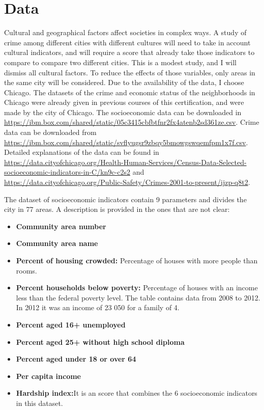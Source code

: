\documentclass[a4paper,12pt]{article}
\begin{document}
\section{Data}
Cultural and geographical factors affect societies in complex ways. A study of crime among different cities with different cultures will need to take in account cultural indicators, and will require a score that already take those indicators to compare to compare two different cities. This is a modest study, and I will dismiss all cultural factors. To reduce the effects of those variables, only  areas in the same city will be considered. Due to the availability of the data, I choose Chicago. The datasets of the crime and economic status of the neighborhoods in Chicago were already given in previous courses of this certification, and were made by the city of Chicago. The socioeconomic data can be downloaded in \url{https://ibm.box.com/shared/static/05c3415cbfbtfnr2fx4atenb2sd361ze.csv}. Crime data can be downloaded from \url{https://ibm.box.com/shared/static/svflyugsr9zbqy5bmowgswqemfpm1x7f.csv}. Detailed explanations of the data can be found in \url{ https://data.cityofchicago.org/Health-Human-Services/Census-Data-Selected-socioeconomic-indicators-in-C/kn9c-c2s2} and \url{ https://data.cityofchicago.org/Public-Safety/Crimes-2001-to-present/ijzp-q8t2}. 

The dataset of socioeconomic indicators contain 9 parameters and divides the city in 77 areas. A description is provided in the ones that are not clear:
\begin{itemize}
\item \textbf{Community area number}
\item \textbf{Community area name}
\item \textbf{Percent of housing crowded:} Percentage of houses with more people than rooms.
\item \textbf{Percent households below poverty:} Percentage of houses with an income less than the federal poverty level. The table contains data from 2008 to 2012. In 2012 it was an income of 23 050 for a family of 4.
\item \textbf{Percent aged 16+ unemployed}
\item \textbf{Percent aged 25+ without high school diploma}
\item \textbf{Percent aged under 18 or over 64}
\item \textbf{Per capita income}
\item \textbf{Hardship index:}It is an score that combines the 6 socioeconomic indicators in this dataset.
\end{itemize}
\end{document}
